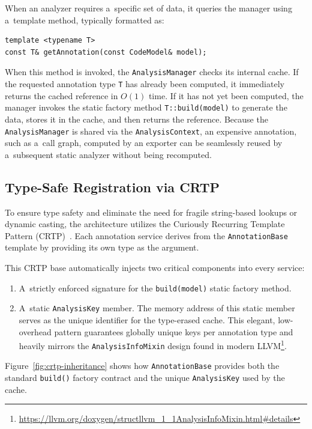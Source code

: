 \documentclass[xpsejal00-gcc-plugin.tex]{subfiles}
\begin{document}
When an analyzer requires a~specific set of data, it queries the manager using a~template method, typically formatted as:

\begin{lstlisting}
template <typename T>
const T& getAnnotation(const CodeModel& model);
\end{lstlisting}

When this method is invoked, the \texttt{AnalysisManager} checks its internal cache.
If the requested annotation type \texttt{T} has already been computed, it immediately returns the cached reference in $O(1)$ time.
If it has not yet been computed, the manager invokes the static factory method \texttt{T::build(model)} to generate the data, stores it in the cache, and then returns the reference.
Because the \texttt{AnalysisManager} is shared via the \texttt{AnalysisContext}, an expensive annotation, such as a~call graph, computed by an exporter can be seamlessly reused by a~subsequent static analyzer without being recomputed.

\subsection*{Type-Safe Registration via CRTP}\label{sub:crtp}

To ensure type safety and eliminate the need for fragile string-based lookups or dynamic casting, the architecture utilizes the Curiously Recurring Template Pattern (CRTP)~\cite{CRTP}.
Each annotation service derives from the \texttt{AnnotationBase} template by providing its own type as the argument.

This CRTP base automatically injects two critical components into every service:

\begin{enumerate}
  \item A~strictly enforced signature for the \texttt{build(model)} static factory method.
  \item A~static \texttt{AnalysisKey} member.
    The memory address of this static member serves as the unique identifier for the type-erased cache.
    This elegant, low-overhead pattern guarantees globally unique keys per annotation type and heavily mirrors the \texttt{AnalysisInfoMixin} design found in modern LLVM\footnote{\url{https://llvm.org/doxygen/structllvm_1_1AnalysisInfoMixin.html\#details}}.\@
\end{enumerate}

Figure~\ref{fig:crtp-inheritance} shows how \texttt{AnnotationBase} provides both the standard \texttt{build()} factory contract and the unique \texttt{AnalysisKey} used by the cache.
\end{document}
